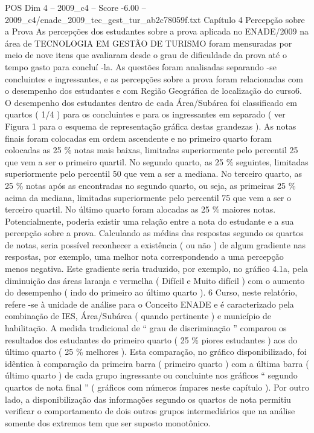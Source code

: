 \begin{textsample}{POS Dim 4 – 2009\_c4 – Score -6.00 – 2009\_c4/enade\_2009\_tec\_gest\_tur\_ab2c78059f.txt}  \label{ex:f4_pos_334}
Capítulo 4 Percepção sobre a Prova As percepções dos estudantes sobre a prova aplicada no ENADE/2009 na área de TECNOLOGIA EM GESTÃO DE TURISMO foram mensuradas por meio de nove itens que avaliaram desde o grau de dificuldade da prova até o tempo gasto para concluí -la.
As questões foram analisadas separando -se concluintes e ingressantes, e as percepções sobre a prova foram relacionadas com o desempenho dos estudantes e com Região Geográfica de localização do curso6.
O desempenho dos estudantes dentro de cada Área/Subárea foi classificado em quartos ( 1/4 ) para os concluintes e para os ingressantes em separado ( ver Figura 1 para o esquema de representação gráfica destas grandezas ).
As notas finais foram colocadas em ordem ascendente e no primeiro quarto foram colocadas as 25 \% notas mais baixas, limitadas superiormente pelo percentil 25 que vem a ser o primeiro quartil.
No segundo quarto, as 25 \% seguintes, limitadas superiormente pelo percentil 50 que vem a ser a mediana.
No terceiro quarto, as 25 \% notas após as encontradas no segundo quarto, ou seja, as primeiras 25 \% acima da mediana, limitadas superiormente pelo percentil 75 que vem a ser o terceiro quartil.
No último quarto foram alocadas as 25 \% maiores notas.
Potencialmente, poderia existir uma relação entre a nota do estudante e a sua percepção sobre a prova.
Calculando as médias das respostas segundo os quartos de notas, seria possível reconhecer a existência ( ou não ) de algum gradiente nas respostas, por exemplo, uma melhor nota correspondendo a uma percepção menos negativa.
Este gradiente seria traduzido, por exemplo, no gráfico 4.1a, pela diminuição das áreas laranja e vermelha ( Difícil e Muito difícil ) com o aumento do desempenho ( indo do primeiro ao último quarto ). 6 Curso, neste relatório, refere -se à unidade de análise para o Conceito ENADE e é caracterizado pela combinação de IES, Área/Subárea ( quando pertinente ) e município de habilitação.
A medida tradicional de “ grau de discriminação ” comparou os resultados dos estudantes do primeiro quarto ( 25 \% piores estudantes ) aos do último quarto ( 25 \% melhores ).
Esta comparação, no gráfico disponibilizado, foi idêntica à comparação da primeira barra ( primeiro quarto ) com a última barra ( último quarto ) de cada grupo ingressante ou concluinte nos gráficos “ segundo quartos de nota final ” ( gráficos com números ímpares neste capítulo ).
Por outro lado, a disponibilização das informações segundo os quartos de nota permitiu verificar o comportamento de dois outros grupos intermediários que na análise somente dos extremos tem que ser suposto monotônico.

\end{textsample}
